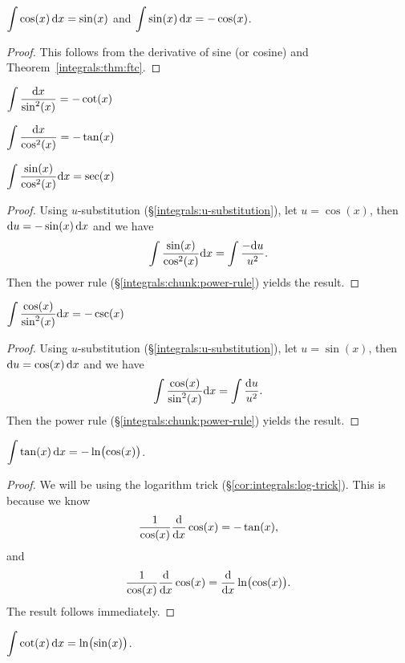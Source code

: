  $\displaystyle{\int \cos(x)\,\mathrm{d}x = \sin(x)}$
and $\displaystyle{\int \sin(x)\,\mathrm{d}x = -\cos(x)}$.

\begin{proof}
This follows from the derivative of sine (or cosine) and Theorem~\ref{integrals:thm:ftc}.
\end{proof}

\M $\displaystyle{\int \frac{\mathrm{d}x}{\sin^{2}(x)} = -\cot(x)}$

\M $\displaystyle{\int \frac{\mathrm{d}x}{\cos^{2}(x)} = -\tan(x)}$

\M $\displaystyle{\int \frac{\sin(x)}{\cos^{2}(x)}\mathrm{d}x = \sec(x)}$

\begin{proof}
Using $u$-substitution (\S\ref{integrals:u-substitution}),
let $u=\cos(x)$, then $\mathrm{d} u=-\sin(x)\,\mathrm{d} x$ and we have
\begin{equation}
\int \frac{\sin(x)}{\cos^{2}(x)}\mathrm{d} x=\int\frac{-\mathrm{d} u}{u^{2}}.
\end{equation}
Then the power rule (\S\ref{integrals:chunk:power-rule}) yields the result.
\end{proof}

\M $\displaystyle{\int \frac{\cos(x)}{\sin^{2}(x)}\mathrm{d}x = -\csc(x)}$

\begin{proof}
Using $u$-substitution (\S\ref{integrals:u-substitution}),
let $u=\sin(x)$, then $\mathrm{d} u=\cos(x)\,\mathrm{d} x$ and we have
\begin{equation}
\int \frac{\cos(x)}{\sin^{2}(x)}\mathrm{d} x=\int\frac{\mathrm{d} u}{u^{2}}.
\end{equation}
Then the power rule (\S\ref{integrals:chunk:power-rule}) yields the result.
\end{proof}

\M $\displaystyle{\int \tan(x)\,\mathrm{d}x = -\ln\bigl(\cos(x)\bigr)}$.

\begin{proof}
We will be using the logarithm trick (\S\ref{cor:integrals:log-trick}).
This is because we know
\begin{equation}
\frac{1}{\cos(x)}\frac{\mathrm{d}}{\mathrm{d} x}\cos(x) = -\tan(x),
\end{equation}
and
\begin{equation}
\frac{1}{\cos(x)}\frac{\mathrm{d}}{\mathrm{d} x}\cos(x) = \frac{\mathrm{d}}{\mathrm{d} x}\ln\bigl(\cos(x)\bigr).
\end{equation}
The result follows immediately.
\end{proof}

\M $\displaystyle{\int \cot(x)\,\mathrm{d}x = \ln\bigl(\sin(x)\bigr)}$.

